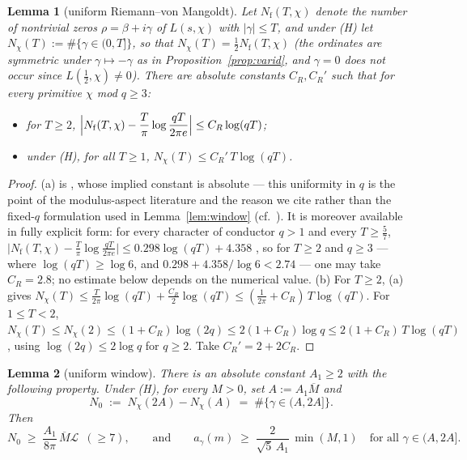 \documentclass[11pt]{article}
\newtheorem{lemma}{Lemma}
\begin{document}
\begin{lemma}[uniform Riemann--von Mangoldt]\label{lem:rvm-joint}
Let $N_{\mathrm f}(T,\chi)$ denote the number of nontrivial zeros
$\rho=\beta+i\gamma$ of $L(s,\chi)$ with $|\gamma|\le T$, and under (H)
let $N_\chi(T):=\#\{\gamma\in(0,T]\}$, so that
$N_\chi(T)=\tfrac12N_{\mathrm f}(T,\chi)$ (the ordinates are symmetric
under $\gamma\mapsto-\gamma$ as in Proposition~\ref{prop:varid}, and
$\gamma=0$ does not occur since $L(\tfrac12,\chi)\ne0$). There are
absolute constants $C_R,C_R'$ such that for every primitive $\chi$ mod
$q\ge3$:
\begin{itemize}
\item[(a)] for $T\ge2$,
$\displaystyle
\Bigl|N_{\mathrm f}(T,\chi)-\frac{T}{\pi}\log\frac{qT}{2\pi e}
\Bigr|\le C_R\log(qT)$;
\item[(b)] under (H), for all $T\ge1$,
$N_\chi(T)\le C_R'\,T\log(qT)$.
\end{itemize}
\end{lemma}

\begin{proof}
(a) is \cite[Theorem~14.5]{MV07}, whose implied constant is absolute
--- this uniformity in $q$ is the point of the modulus-aspect
literature and the reason we cite \cite{MV07} rather than the
fixed-$q$ formulation used in Lemma~\ref{lem:window}
(cf.\ \cite[\S16]{Dav00}). It is moreover available in fully
explicit form: for every character of conductor $q>1$ and every
$T\ge\tfrac57$,
$\bigl|N_{\mathrm f}(T,\chi)-\tfrac T\pi\log\tfrac{qT}{2\pi e}\bigr|
\le0.298\log(qT)+4.358$ \cite[Corollary~1.2]{BMOR21}, so for
$T\ge2$ and $q\ge3$ --- where $\log(qT)\ge\log6$, and
$0.298+4.358/\log6<2.74$ --- one may take $C_R=2.8$; no estimate
below depends on the numerical value. (b) For $T\ge2$, (a) gives
$N_\chi(T)\le\tfrac{T}{2\pi}\log(qT)+\tfrac{C_R}2\log(qT)
\le(\tfrac1{2\pi}+C_R)\,T\log(qT)$. For $1\le T<2$,
$N_\chi(T)\le N_\chi(2)\le(1+C_R)\log(2q)\le2(1+C_R)\log q
\le2(1+C_R)\,T\log(qT)$, using $\log(2q)\le2\log q$ for $q\ge2$. Take
$C_R'=2+2C_R$.
\end{proof}

\begin{lemma}[uniform window]\label{lem:window-joint}
There is an absolute constant $A_1\ge2$ with the following property.
Under (H), for every $M>0$, set $A:=A_1\overline M$ and
\[
N_0\;:=\;N_\chi(2A)-N_\chi(A)
\;=\;\#\{\gamma\in(A,2A]\}.
\]
Then
\begin{equation}\label{eq:windowq}
N_0\;\ge\;\frac{A_1}{8\pi}\,\overline M\mathcal L\;\ (\ge7),
\qquad\text{and}\qquad
a_\gamma(m)\;\ge\;\frac{2}{\sqrt5\,A_1}\,\min(M,1)
\quad\text{for all }\gamma\in(A,2A].
\end{equation}
\end{lemma}
\end{document}
